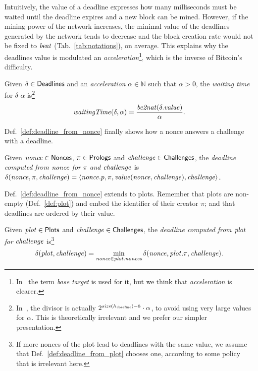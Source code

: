 %
Intuitively, the value of a deadline expresses how many milliseconds
must be waited until the deadline expires and a new block can be mined.
However, if the mining power of the network increases, the minimal value of the deadlines
generated by the network tends to decrease and the block creation rate would not be
fixed to ${\mathit{beat}}$ (Tab.~\ref{tab:notations}), on average.
This explains why the deadlines value is modulated \wrt an
\emph{acceleration}\footnote{In~\cite{SignumPlotting} the term
\emph{base target} is used for it, but we think that \emph{acceleration} is clearer.},
which is the inverse of Bitcoin's difficulty.
%
\begin{definition}\label{def:deadline_waiting_time}
  Given $\delta\in{\mathsf{Deadlines}}$ and an \emph{acceleration}
  $\alpha\in\mathbb{N}$ such that $\alpha>0$, the
  \emph{waiting time} for $\delta$ \wrt $\alpha$ is\footnote{
  In~\cite{SignumPlotting}, the divisor is actually
  $2^{{\mathit{size}}(h_{\mathit{deadline}})-8}\cdot\alpha$, to avoid using very large values for
  $\alpha$. This is theoretically irrelevant and we prefer our simpler presentation.
  }
  \[
  {\mathit{waitingTime}}(\delta,\alpha)
  =\frac{{\mathit{be2nat}}(\delta.\mathit{value})}{\alpha}.
  \]
\end{definition}
%
Def.~\ref{def:deadline_from_nonce} finally shows how a nonce answers a challenge with a deadline.
%
\begin{definition}[$\delta(\nonce,\pi,\challenge)$]\label{def:deadline_from_nonce}
  Given ${\mathit{nonce}}\in{\mathsf{Nonces}}$, $\pi\in{\mathsf{Prologs}}$ and ${\mathit{challenge}}\in{\mathsf{Challenges}}$, the
  \emph{deadline computed from ${\mathit{nonce}}$ for $\pi$ and ${\mathit{challenge}}$} is
  $\delta({\mathit{nonce}},\pi,{\mathit{challenge}})=\langle{\mathit{nonce}}.p,\pi,\mathit{value}({\mathit{nonce}},{\mathit{challenge}}),{\mathit{challenge}}\rangle$.
\end{definition}
%
Def.~\ref{def:deadline_from_nonce} extends to plots. Remember that plots are non-empty
(Def.~\ref{def:plot}) and embed the identifier of their creator $\pi$;
and that deadlines are ordered by their value.
%
\begin{definition}[$\deadline(\plot,\challenge)$]\label{def:deadline_from_plot}
  Given ${\mathit{plot}}\in{\mathsf{Plots}}$ and ${\mathit{challenge}}\in{\mathsf{Challenges}}$, the \emph{deadline computed
  from ${\mathit{plot}}$ for ${\mathit{challenge}}$} is\footnote{If more nonces of the plot lead to deadlines
  with the same value, we assume that Def.~\ref{def:deadline_from_plot} chooses one,
  according to some policy that is irrelevant here.}
  \[
  \delta({\mathit{plot}},{\mathit{challenge}})=\min\limits_{{\mathit{nonce}}\in{\mathit{plot}}.{\mathit{nonces}}}\delta({\mathit{nonce}},{\mathit{plot}}.\pi,{\mathit{challenge}}).
  \]
\end{definition}
